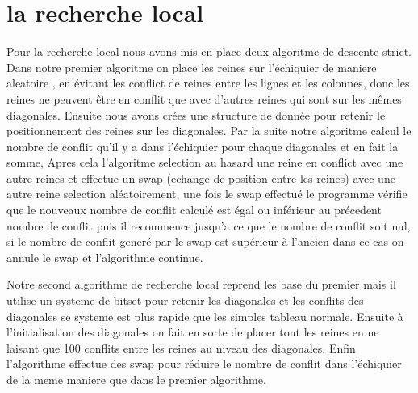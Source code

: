 \section{la recherche local}

Pour la recherche local nous avons mis en place deux algoritme de descente strict.
Dans notre premier algoritme on place les reines sur l'échiquier de maniere aleatoire , en évitant les conflict de reines entre les lignes et les colonnes, donc les reines ne peuvent être en conflit que avec d'autres reines qui sont sur les mêmes diagonales.
Ensuite nous avons crées une structure de donnée pour retenir le positionnement des reines sur les diagonales. %
Par la suite notre algoritme calcul le nombre de conflit qu'il y a dans l'échiquier pour chaque diagonales et en fait la somme, Apres cela l'algoritme selection au hasard une reine en conflict avec une autre reines et effectue un swap (echange de position entre les reines) avec une autre reine selection aléatoirement, une fois le swap effectué le programme vérifie que le nouveaux nombre de conflit calculé est égal ou inférieur au précedent nombre de conflit puis il recommence jusqu'a ce que le nombre de conflit soit nul, si le nombre de conflit generé par le swap est supérieur à l'ancien dans ce cas on annule le swap et l'algorithme continue.  

\vspace{0.5cm}
Notre second algorithme de recherche local reprend les base du premier mais il utilise un systeme de bitset pour retenir les diagonales et les conflits des diagonales se systeme est plus rapide que les simples tableau normale. Ensuite à l'initialisation des diagonales on fait en sorte de placer tout les reines en ne laisant que 100 conflits entre les reines au niveau des diagonales.
Enfin l'algorithme effectue des swap pour réduire le nombre de conflit dans l'échiquier de la meme maniere que dans le premier algorithme.

